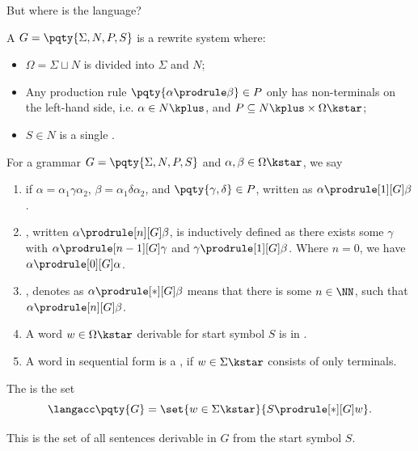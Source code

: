But where is the language?

\begin{definition}
    A  \(G = \pqty{\Sigma, N, P, S}\) is a rewrite system where:
    \begin{itemize}
        \item \(\Omega = \Sigma \sqcup N\) is divided into  \(\Sigma\) and  \(N\);
        \item Any production rule \(\pqty{\alpha \prodrule \beta} \in P\) only has non-terminals on the left-hand side, i.e. \(\alpha \in N\kplus\), and \(P \subseteq N\kplus \times \Omega\kstar\);
        \item \(S \in N\) is a single .
    \end{itemize}

    For a grammar \(G = \pqty{\Sigma, N, P, S}\) and \(\alpha, \beta \in \Omega\kstar\), we say
    \begin{enumerate}[label=(\roman*)]
        \item {} if \(\alpha = \alpha_1 \gamma \alpha_2\), \(\beta = \alpha_1 \delta \alpha_2\), and \(\pqty{\gamma, \delta} \in P\), written as \(\alpha \prodrule[1][G] \beta\).
        \item {}, written \(\alpha \prodrule[n][G] \beta\), is inductively defined as there exists some \(\gamma\) with \(\alpha \prodrule[n-1][G] \gamma\) and \(\gamma \prodrule[1][G] \beta\). Where \(n = 0\), we have \(\alpha \prodrule[0][G] \alpha\).
        \item {}, denotes as \(\alpha \prodrule[\ast][G] \beta\) means that there is some \(n \in \NN\), such that \(\alpha \prodrule[n][G] \beta\).
        \item A word \(w \in \Omega\kstar\) derivable for start symbol \(S\) is in .
        \item A word in sequential form is a , if \(w \in \Sigma\kstar\) consists of only terminals.
    \end{enumerate}
\end{definition}

\begin{definition}
    The  is the set
    \[
        \langacc\pqty{G} = \set{w \in \Sigma\kstar}{S \prodrule[\ast][G] w}.
    \]

    This is the set of all sentences derivable in \(G\) from the start symbol \(S\).
\end{definition}

